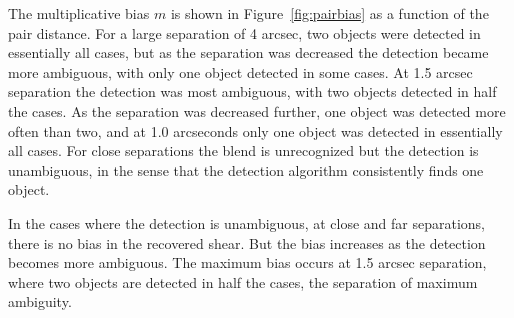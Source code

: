 \documentclass[draft, iop, twocolappendix, appendixfloats, numberedappendix, apj]{hackemulateapj}
\begin{document}
The multiplicative bias $m$ is shown in Figure~\ref{fig:pairbias} as a function
of the pair distance. For a large separation of 4 arcsec, two objects were
detected in essentially all cases, but as the separation was decreased the
detection became more ambiguous, with only one object detected in some cases.
At 1.5 arcsec separation the detection was most ambiguous, with two objects
detected in half the cases. As the separation was decreased further, one object
was detected more often than two, and at 1.0 arcseconds only one object was
detected in essentially all cases.  For close separations the blend is
unrecognized but the detection is unambiguous, in the sense that the
detection algorithm consistently finds one object.

In the cases where the detection is unambiguous, at close and far separations,
there is no bias in the recovered shear.  But the bias increases as the
detection becomes more ambiguous. The maximum bias occurs at 1.5 arcsec
separation, where two objects are detected in half the cases, the separation of
maximum ambiguity.
\end{document}
